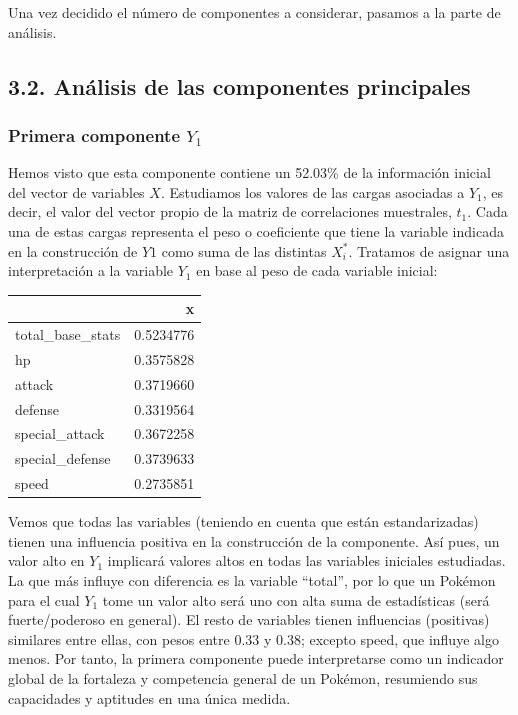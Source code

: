\documentclass[
  11.8pt,
]{extreport}
\begin{document}
Una vez decidido el número de componentes a considerar, pasamos a la
parte de análisis.

\subsection{3.2. Análisis de las componentes
principales}\label{anuxe1lisis-de-las-componentes-principales}

\subsubsection{\texorpdfstring{Primera componente
\(Y_1\)}{Primera componente Y\_1}}\label{primera-componente-y_1}

Hemos visto que esta componente contiene un 52.03\% de la información
inicial del vector de variables \(X\). Estudiamos los valores de las
cargas asociadas a \(Y_1\), es decir, el valor del vector propio de la
matriz de correlaciones muestrales, \(t_1\). Cada una de estas cargas
representa el peso o coeficiente que tiene la variable indicada en la
construcción de \(Y1\) como suma de las distintas \(X_i^*\). Tratamos de
asignar una interpretación a la variable \(Y_1\) en base al peso de cada
variable inicial:

\begin{table}[H]
\centering\begingroup\fontsize{10.5}{12.5}\selectfont

\begin{tabular}{lr}
\toprule
  & x\\
\midrule
total\_base\_stats & 0.5234776\\
hp & 0.3575828\\
attack & 0.3719660\\
defense & 0.3319564\\
special\_attack & 0.3672258\\
\addlinespace
special\_defense & 0.3739633\\
speed & 0.2735851\\
\bottomrule
\end{tabular}
\endgroup{}
\end{table}

Vemos que todas las variables (teniendo en cuenta que están
estandarizadas) tienen una influencia positiva en la construcción de la
componente. Así pues, un valor alto en \(Y_1\) implicará valores altos
en todas las variables iniciales estudiadas. La que más influye con
diferencia es la variable ``total'', por lo que un Pokémon para el cual
\(Y_1\) tome un valor alto será uno con alta suma de estadísticas (será
fuerte/poderoso en general). El resto de variables tienen influencias
(positivas) similares entre ellas, con pesos entre 0.33 y 0.38; excepto
speed, que influye algo menos. Por tanto, la primera componente puede
interpretarse como un indicador global de la fortaleza y competencia
general de un Pokémon, resumiendo sus capacidades y aptitudes en una
única medida.
\end{document}
